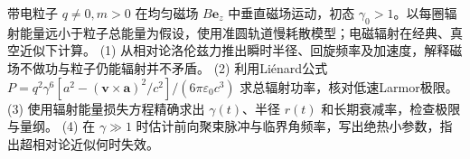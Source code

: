 带电粒子 \(q\ne0,m>0\) 在均匀磁场 \(B\boldsymbol e_z\) 中垂直磁场运动，初态 \(\gamma_0>1\)。以每圈辐射能量远小于粒子总能量为假设，使用准圆轨道慢耗散模型；电磁辐射在经典、真空近似下计算。
(1) 从相对论洛伦兹力推出瞬时半径、回旋频率及加速度，解释磁场不做功与粒子仍能辐射并不矛盾。
(2) 利用Liénard公式 \(P=q^2\gamma^6[a^2-(\boldsymbol v\times\boldsymbol a)^2/c^2]/(6\pi\varepsilon_0c^3)\) 求总辐射功率，核对低速Larmor极限。
(3) 使用辐射能量损失方程精确求出 \(\gamma(t)\)、半径 \(r(t)\) 和长期衰减率，检查极限与量纲。
(4) 在 \(\gamma\gg1\) 时估计前向聚束脉冲与临界角频率，写出绝热小参数，指出超相对论近似何时失效。
